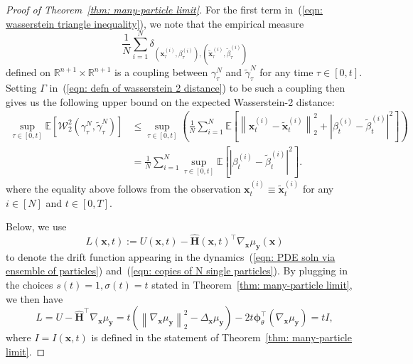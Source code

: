 \documentclass{article}
\numberwithin{equation}{section}
\def\eqref#1{(\ref{#1})}
\def\vx{{\bm{x}}}
\def\vy{{\bm{y}}}
\def\vphi{{\bm{\phi}}}
\def\mH{{\bm{H}}}
\def\gW{{\mathcal{W}}}
\newcommand{\E}{\mathbb{E}}
\begin{document}
\begin{proof}[Proof of Theorem~\ref{thm: many-particle limit}]
    For the first term in~\eqref{eqn: wasserstein triangle inequality}, we note that the empirical measure 
    $$
        \frac{1}{N}\sum_{i=1}^{N}\delta_{(\vx^{(i)}_\tau,\beta^{(i)}_\tau),(\widetilde{\vx}^{(i)}_\tau,\widetilde{\beta}^{(i)}_\tau)}
    $$ 
    defined on $\mathbb{R}^{n+1} \times \mathbb{R}^{n+1}$ is a coupling between $\gamma^N_\tau$ and $\widetilde{\gamma}^N_\tau$ for any time $\tau \in [0,t]$. Setting $\Gamma$ in~\eqref{eqn: defn of wasserstein 2 distance} to be such a coupling then gives us the following upper bound on the expected Wasserstein-2 distance:
    \begin{equation}
        \label{eqn: coupling bound}
        \begin{aligned}
        \sup_{\tau \in [0,t]}\E\left[\gW^2_2(\gamma^{N}_\tau, \widetilde{\gamma}^{N}_\tau)\right] &\leq \sup_{\tau \in [0,t]}\left(\frac{1}{N}\sum_{i=1}^{N}\E\left[\left\|\vx^{(i)}_t - \widetilde{\vx}^{(i)}_t\right\|_2^2 + \left|\beta^{(i)}_t - \widetilde{\beta}^{(i)}_t\right|^2\right]\right)\\
        &= \frac{1}{N}\sum_{i=1}^{N}\sup_{\tau \in [0,t]}\E\left[\left|\beta^{(i)}_t - \widetilde{\beta}^{(i)}_t\right|^2\right].     
        \end{aligned}  
    \end{equation}
    where the equality above follows from the observation $\vx^{(i)}_t \equiv \widetilde{\vx}^{(i)}_t$ for any $i \in [N]$ and $t \in [0,T]$. 
    
    Below, we use 
    $$
        L(\vx,t):=U(\vx,t) - \widehat{\mH}(\vx,t)^\intercal\nabla_{\vx}\mu_{\vy}(\vx)
    $$ 
    to denote the drift function appearing in the dynamics~\eqref{eqn: PDE soln via ensemble of particles} and~\eqref{eqn: copies of N single particles}. By plugging in the choices $s(t) = 1, \sigma(t) = t$ stated in Theorem~\ref{thm: many-particle limit}, we then have 
    \begin{equation}
    \label{eqn: computation of drift function under particular choices}
    L =U - \widehat{\mH}^\intercal\nabla_{\vx}\mu_{\vy} = t\left(\left\|\nabla_{\vx}\mu_{\vy}\right\|_2^2 - \Delta_{\vx}\mu_{\vy}\right) - 2t\vphi_{\theta}^\intercal\left(\nabla_{\vx}\mu_{\vy}\right) = tI,
    \end{equation}
    where $I = I(\vx,t)$ is defined in the statement of Theorem~\ref{thm: many-particle limit}. 



\end{proof}
\end{document}
